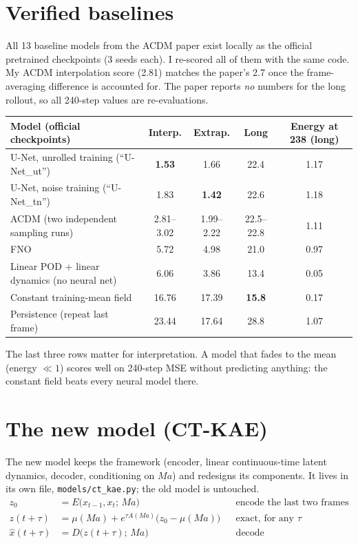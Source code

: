 \documentclass[10.5pt,a4paper]{article}
\begin{document}
\section{Verified baselines}\label{sec:baselines}

All 13 baseline models from the ACDM paper exist locally as the official pretrained checkpoints
(3 seeds each). I re-scored all of them with the same code. My ACDM interpolation score (2.81)
matches the paper's 2.7 once the frame-averaging difference is accounted for. The paper reports
\emph{no} numbers for the long rollout, so all 240-step values are re-evaluations.

\begin{center}\small
\begin{tabular}{lcccc}
\toprule
Model (official checkpoints) & Interp. & Extrap. & Long & Energy at 238 (long)\\
\midrule
U-Net, unrolled training (``U-Net\_ut'')     & \textbf{1.53} & 1.66 & 22.4 & 1.17\\
U-Net, noise training (``U-Net\_tn'')        & 1.83 & \textbf{1.42} & 22.6 & 1.18\\
ACDM (two independent sampling runs)         & 2.81--3.02 & 1.99--2.22 & 22.5--22.8 & 1.11\\
FNO                                          & 5.72 & 4.98 & 21.0 & 0.97\\
Linear POD + linear dynamics (no neural net) & 6.06 & 3.86 & 13.4 & 0.05\\
Constant training-mean field                 & 16.76 & 17.39 & \textbf{15.8} & 0.17\\
Persistence (repeat last frame)              & 23.44 & 17.64 & 28.8 & 1.07\\
\bottomrule
\end{tabular}
\end{center}

\noindent The last three rows matter for interpretation. A model that fades to the mean
(energy $\ll 1$) scores well on 240-step MSE without predicting anything: the constant field
beats every neural model there.

\section{The new model (CT-KAE)}\label{sec:model}

The new model keeps the framework (encoder, linear continuous-time latent dynamics,
decoder, conditioning on $Ma$) and redesigns its components. It lives in its own file,
\texttt{models/ct\_kae.py}; the old model is untouched.
\begin{align*}
z_0 &= E\big(x_{t-1}, x_t;\, Ma\big) && \text{encode the last two frames}\\
z(t+\tau) &= \mu(Ma) + e^{\tau A(Ma)}\big(z_0 - \mu(Ma)\big) && \text{exact, for any } \tau\\
\hat x(t+\tau) &= D\big(z(t+\tau);\, Ma\big) && \text{decode}
\end{align*}
\end{document}
